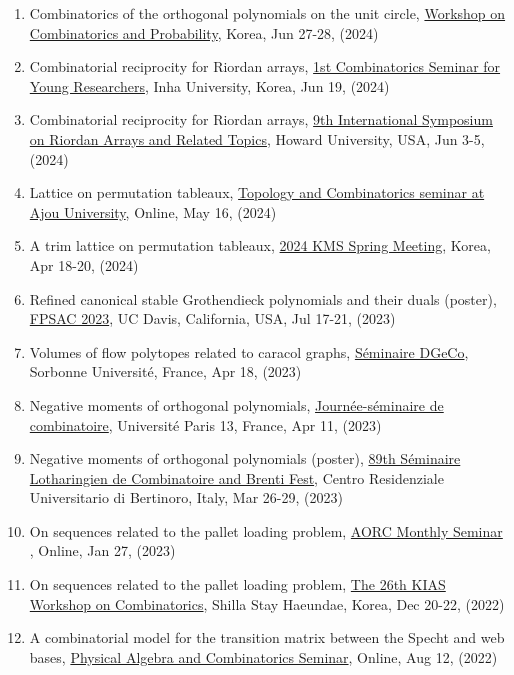 \documentclass[letterpaper]{article}
\begin{document}
\begin{enumerate}
\item Combinatorics of the orthogonal polynomials on the unit circle, \href{http://events.kias.re.kr/h/CombinatoricsProbability/?pageNo=5480}{Workshop on Combinatorics and Probability}, Korea, Jun 27-28, (2024)
\item Combinatorial reciprocity for Riordan arrays, \href{https://sites.google.com/view/csyr/1st?authuser=0}{1st Combinatorics Seminar for Young Researchers}, Inha University, Korea, Jun 19, (2024)
\item Combinatorial reciprocity for Riordan arrays, \href{https://www.riordanarray.org/}{9th International Symposium on Riordan Arrays and Related Topics}, Howard University, USA, Jun 3-5, (2024)
\item Lattice on permutation tableaux, \href{https://sites.google.com/ajou.ac.kr/tcseminar/}{Topology and Combinatorics seminar at Ajou University}, Online, May 16, (2024)
\item A trim lattice on permutation tableaux, \href{https://www.kms.or.kr/conference/2024_spring/}{2024 KMS Spring Meeting}, Korea, Apr 18-20, (2024)
\item Refined canonical stable Grothendieck polynomials and their duals (poster), \href{http://fpsac23.math.ucdavis.edu/}{FPSAC 2023}, UC Davis, California, USA, Jul 17-21, (2023)
\item Volumes of flow polytopes related to caracol graphs, \href{https://dgeco.math.cnrs.fr/}{Séminaire DGeCo}, Sorbonne Université, France, Apr 18, (2023)
\item Negative moments of orthogonal polynomials, \href{https://lipn.fr/~banderier/Seminaires/}{Journée-séminaire de combinatoire}, Université Paris 13, France, Apr 11, (2023)
\item Negative moments of orthogonal polynomials (poster), \href{https://events.unibo.it/combinatorics}{89th Séminaire Lotharingien de Combinatoire and Brenti Fest}, Centro Residenziale Universitario di Bertinoro, Italy, Mar 26-29, (2023)
\item On sequences related to the pallet loading problem, \href{https://swb.skku.edu/aorc/seminar.do?mode=view&articleNo=39837&article.offset=0&articleLimit=10}{AORC Monthly Seminar }, Online, Jan 27, (2023)
\item On sequences related to the pallet loading problem, \href{http://events.kias.re.kr/h/combinatorics/?pageNo=4839}{The 26th KIAS Workshop on Combinatorics}, Shilla Stay Haeundae, Korea, Dec 20-22, (2022)
\item A combinatorial model for the transition matrix between the Specht and web bases, \href{https://tscrim.github.io/pacs_en.html}{Physical Algebra and Combinatorics Seminar}, Online, Aug 12, (2022)

\end{enumerate}
\end{document}

